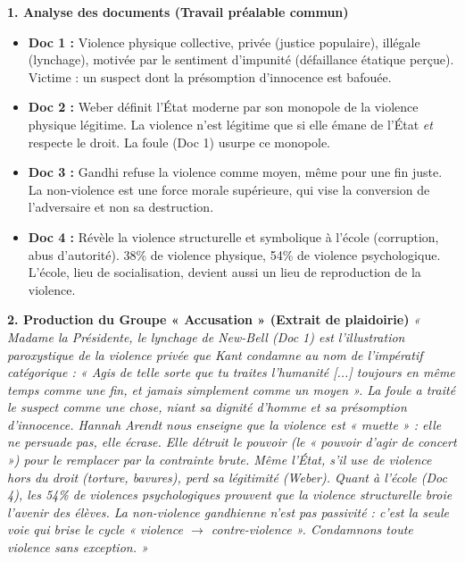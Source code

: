 \documentclass[11pt]{article}
\newcommand{\cle}[1]{{\popxbold\color{popdark}#1}}
\begin{document}
\begin{exoresolu}
\textbf{1. Analyse des documents (Travail préalable commun)}
\begin{itemize}
    \item \textbf{Doc 1 :} Violence \cle{physique} collective, \cle{privée} (justice populaire), \cle{illégale} (lynchage), motivée par le sentiment d'impunité (défaillance étatique perçue). Victime : un suspect dont la présomption d'innocence est bafouée.
    \item \textbf{Doc 2 :} Weber définit l'État moderne par son \cle{monopole de la violence physique légitime}. La violence n'est légitime que si elle émane de l'État \emph{et} respecte le droit. La foule (Doc 1) usurpe ce monopole.
    \item \textbf{Doc 3 :} Gandhi refuse la violence comme moyen, même pour une fin juste. La non-violence est une \cle{force morale} supérieure, qui vise la conversion de l'adversaire et non sa destruction.
    \item \textbf{Doc 4 :} Révèle la \cle{violence structurelle} et \cle{symbolique} à l'école (corruption, abus d'autorité). 38\% de violence physique, 54\% de violence psychologique. L'école, lieu de socialisation, devient aussi un lieu de reproduction de la violence.
\end{itemize}

\textbf{2. Production du Groupe « Accusation » (Extrait de plaidoirie)}
\emph{« Madame la Présidente, le lynchage de New-Bell (Doc 1) est l'illustration paroxystique de la \cle{violence privée} que Kant condamne au nom de l'impératif catégorique : « Agis de telle sorte que tu traites l'humanité [...] toujours en même temps comme une fin, et jamais simplement comme un moyen ». La foule a traité le suspect comme une chose, niant sa dignité d'homme et sa présomption d'innocence. Hannah Arendt nous enseigne que la violence est « muette » : elle ne persuade pas, elle écrase. Elle détruit le \emph{pouvoir} (le « pouvoir d'agir de concert ») pour le remplacer par la contrainte brute. Même l'État, s'il use de violence hors du droit (torture, bavures), perd sa légitimité (Weber). Quant à l'école (Doc 4), les 54\% de violences psychologiques prouvent que la violence structurelle broie l'avenir des élèves. La non-violence gandhienne n'est pas passivité : c'est la seule voie qui brise le cycle « violence $\rightarrow$ contre-violence ». Condamnons toute violence sans exception. »}


\end{exoresolu}
\end{document}
